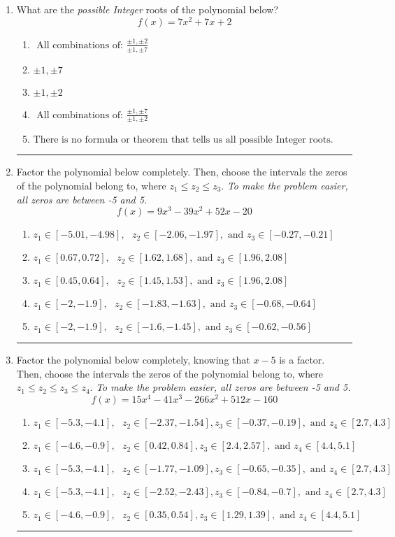 \documentclass[14pt]{extbook}
\newcommand{\litem}[1]{\item#1\hspace*{-1cm}\rule{\textwidth}{0.4pt}}
\begin{document}
\begin{enumerate}
\litem{
What are the \textit{possible Integer} roots of the polynomial below?\[ f(x) = 7x^{2} +7 x + 2 \]\begin{enumerate}[label=\Alph*.]
\item \( \text{ All combinations of: }\frac{\pm 1,\pm 2}{\pm 1,\pm 7} \)
\item \( \pm 1,\pm 7 \)
\item \( \pm 1,\pm 2 \)
\item \( \text{ All combinations of: }\frac{\pm 1,\pm 7}{\pm 1,\pm 2} \)
\item \( \text{There is no formula or theorem that tells us all possible Integer roots.} \)

\end{enumerate} }
\litem{
Factor the polynomial below completely. Then, choose the intervals the zeros of the polynomial belong to, where $z_1 \leq z_2 \leq z_3$. \textit{To make the problem easier, all zeros are between -5 and 5.}\[ f(x) = 9x^{3} -39 x^{2} +52 x -20 \]\begin{enumerate}[label=\Alph*.]
\item \( z_1 \in [-5.01, -4.98], \text{   }  z_2 \in [-2.06, -1.97], \text{   and   } z_3 \in [-0.27, -0.21] \)
\item \( z_1 \in [0.67, 0.72], \text{   }  z_2 \in [1.62, 1.68], \text{   and   } z_3 \in [1.96, 2.08] \)
\item \( z_1 \in [0.45, 0.64], \text{   }  z_2 \in [1.45, 1.53], \text{   and   } z_3 \in [1.96, 2.08] \)
\item \( z_1 \in [-2, -1.9], \text{   }  z_2 \in [-1.83, -1.63], \text{   and   } z_3 \in [-0.68, -0.64] \)
\item \( z_1 \in [-2, -1.9], \text{   }  z_2 \in [-1.6, -1.45], \text{   and   } z_3 \in [-0.62, -0.56] \)

\end{enumerate} }
\litem{
Factor the polynomial below completely, knowing that $x -5$ is a factor. Then, choose the intervals the zeros of the polynomial belong to, where $z_1 \leq z_2 \leq z_3 \leq z_4$. \textit{To make the problem easier, all zeros are between -5 and 5.}\[ f(x) = 15x^{4} -41 x^{3} -266 x^{2} +512 x -160 \]\begin{enumerate}[label=\Alph*.]
\item \( z_1 \in [-5.3, -4.1], \text{   }  z_2 \in [-2.37, -1.54], z_3 \in [-0.37, -0.19], \text{   and   } z_4 \in [2.7, 4.3] \)
\item \( z_1 \in [-4.6, -0.9], \text{   }  z_2 \in [0.42, 0.84], z_3 \in [2.4, 2.57], \text{   and   } z_4 \in [4.4, 5.1] \)
\item \( z_1 \in [-5.3, -4.1], \text{   }  z_2 \in [-1.77, -1.09], z_3 \in [-0.65, -0.35], \text{   and   } z_4 \in [2.7, 4.3] \)
\item \( z_1 \in [-5.3, -4.1], \text{   }  z_2 \in [-2.52, -2.43], z_3 \in [-0.84, -0.7], \text{   and   } z_4 \in [2.7, 4.3] \)
\item \( z_1 \in [-4.6, -0.9], \text{   }  z_2 \in [0.35, 0.54], z_3 \in [1.29, 1.39], \text{   and   } z_4 \in [4.4, 5.1] \)


\end{enumerate}}
\end{enumerate}
\end{document}
